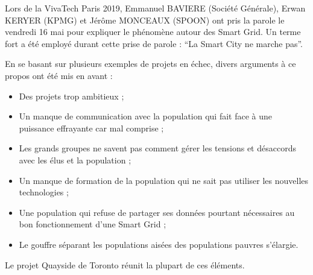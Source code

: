 Lors de la VivaTech Paris 2019, Emmanuel BAVIERE (Société Générale), Erwan KERYER (KPMG) 
et Jérôme MONCEAUX (SPOON) ont pris la parole le vendredi 16 mai pour expliquer le phénomène autour des 
Smart Grid. Un terme fort a été employé durant cette prise de parole : 
``La Smart City ne marche pas''.

En se basant sur plusieurs exemples de projets en échec, divers arguments à ce propos ont été mis en 
avant : 
\begin{itemize}
    \item Des projets trop ambitieux ;
    \item Un manque de communication avec la population qui fait face à une puissance effrayante car mal comprise ;
    \item Les grands groupes ne savent pas comment gérer les tensions et désaccords avec les élus et la population ; 
    \item Un manque de formation de la population qui ne sait pas utiliser les nouvelles technologies ;
    \item Une population qui refuse de partager ses données pourtant nécessaires au bon fonctionnement d’une Smart Grid ;
    \item Le gouffre séparant les populations aisées des populations pauvres s'élargie.
\end{itemize}

Le projet Quayside de Toronto réunit la plupart de ces éléments. 
